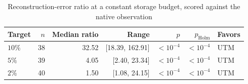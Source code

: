 \begin{table}[t]
\centering
\caption{Reconstruction-error ratio at a constant storage budget, scored against the native observation}
\label{tab:error_at_size_common}
\footnotesize
\setlength{\tabcolsep}{3pt}
\begin{tabular}{lrrrrrl}
\toprule
Target & $n$ & Median ratio & Range & $p$ & $p_{\mathrm{Holm}}$ & Favors \\
\midrule
$10\%$ & 38 & 32.52 & [18.39, 162.91] & $<10^{-4}$ & $<10^{-4}$ & UTM \\
$5\%$ & 39 & 4.05 & [2.40, 23.34] & $<10^{-4}$ & $<10^{-4}$ & UTM \\
$2\%$ & 40 & 1.50 & [1.08, 24.15] & $<10^{-4}$ & $<10^{-4}$ & UTM \\
\bottomrule
\end{tabular}
\end{table}
